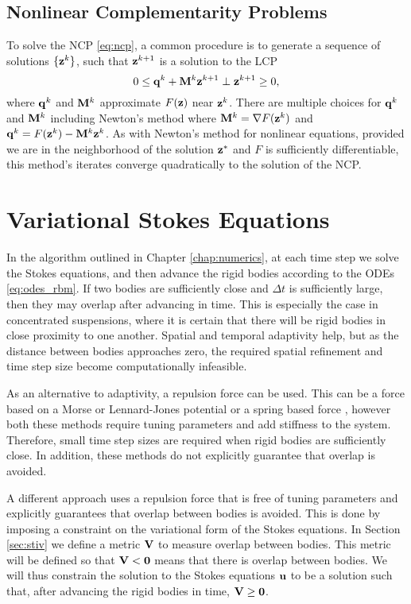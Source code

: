 \subsection{Nonlinear Complementarity Problems}

To solve the NCP \eqref{eq:ncp}, a common procedure is to generate a sequence of solutions $\{{\mathbf{z}}^k\}$, such that ${\mathbf{z}}^{k+1}$ is a solution to the LCP 
\[ 0 \leq {\mathbf{q}}^k + {\mathbf{M}}^k {\mathbf{z}}^{k+1} \perp {\mathbf{z}}^{k+1} \geq 0,\]
where ${\mathbf{q}}^k$ and ${\mathbf{M}}^k$ approximate $F({\mathbf{z}})$ near ${\mathbf{z}}^k$. There are multiple choices for ${\mathbf{q}}^k$ and ${\mathbf{M}}^k$ including Newton's method where ${\mathbf{M}}^k=\nabla F({\mathbf{z}}^k)$ and ${\mathbf{q}}^k= F({\mathbf{z}}^k) - {\mathbf{M}}^k{\mathbf{z}}^k$. As with Newton's method for nonlinear equations, provided we are in the neighborhood of the solution ${\mathbf{z}}^*$ and $F$ is sufficiently differentiable, this method's iterates converge quadratically to the solution of the NCP. 


\section{Variational Stokes Equations}\label{sec:stokes_variation}

In the algorithm outlined in Chapter \ref{chap:numerics}, at each time step we solve the Stokes equations, and then advance the rigid bodies according to the ODEs \eqref{eq:odes_rbm}. If two bodies are sufficiently close and $\Delta t$ is sufficiently large, then they may overlap after advancing in time. This is especially the case in concentrated suspensions, where it is certain that there will be rigid bodies in close proximity to one another. Spatial and temporal adaptivity \cite{Kropinski1999} help, but  as the distance between bodies approaches zero, the required spatial refinement and time step size become computationally infeasible. 

As an alternative to adaptivity, a repulsion force can be used. This can be a force based on a Morse or Lennard-Jones potential \cite{Flormann2017, Liu2006} or a spring based force \cite{Kabacogulu2017, Zhao2013}, however both these methods require tuning parameters and add stiffness to the system. Therefore, small  time step sizes are required when rigid bodies are sufficiently close. In addition, these methods do not explicitly guarantee that overlap is avoided. 

A different approach  \cite{Lu2017} uses a repulsion force that is free of tuning parameters and explicitly guarantees that overlap between bodies is avoided. This is done by imposing a constraint on the variational form of the Stokes equations. In Section \ref{sec:stiv} we define a metric ${\mathbf{V}}$ to measure overlap between bodies. This metric will be defined so that ${\mathbf{V}} < \mathbf{0}$ means that there is overlap between bodies. We will thus constrain the solution to the Stokes equations ${\mathbf{u}}$ to be a solution such that, after advancing the rigid bodies in time, ${\mathbf{V}} \geq \mathbf{0}$. 

